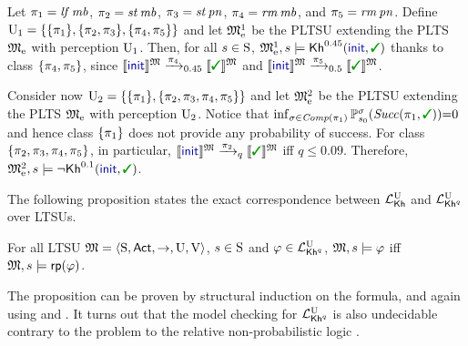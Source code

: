 \begin{example}\label{ex:running:pkhunc}
  Let
  $\plan_1 = \lift\,\mobile$, $\plan_2 = \stairs\,\mobile$,
  $\plan_3 = \stairs\,\panic$, $\plan_4 = \ramp\,\mobile$, and
  $\plan_5 = \ramp\,\panic$.
  Define
  $\Unc_1 = \{ \{\plan_1\}, \{\plan_2,\plan_3\}, \{\plan_4,\plan_5\}\}$
  and let $\modelex^1$ be the PLTSU extending the PLTS $\modelex$ with
  perception $\Unc_1$.
  Then, for all $s\in\S$,
  $\modelex^1,s \models \kh^{0.45}(\init,\goal)$ 
  thanks to class $\{\plan_4,\plan_5\}$, since
  $\truthset{\model}{\init}\reach{\plan_4}_{0.45}\truthset{\model}{\goal}$
  and
  $\truthset{\model}{\init}\reach{\plan_5}_{0.5}\truthset{\model}{\goal}$.

  Consider now
  $\Unc_2 = \{ \{\plan_1\}, \{\plan_2,\plan_3,\plan_4,\plan_5\}\}$
  and let $\modelex^2$ be the PLTSU extending the PLTS $\modelex$ with
  perception $\Unc_2$.
  Notice that
  $\inf_{\strat\in\Comp(\plan_1)}\Prob^\strat_{s_0}(\Succ(\plan_1,\goal)){=}0$
  and hence class $\{\plan_1\}$ does not provide any probability of
  success.
  For class $\{\plan_2,\plan_3,\plan_4,\plan_5\}$, in particular,
  $\truthset{\model}{\init}\reach{\plan_2}_q\truthset{\model}{\goal}$
  iff $q\leq 0.09$.
  Therefore, $\modelex^2, s \models \neg \kh^{0.1}(\init,\goal)$.
\end{example}


The following proposition states the exact correspondence between
$\Khunc$ and $\PKhunc$ over LTSUs.
%
%
\begin{proposition}\label{prop:Khunc:PKhunc}
    For all LTSU $\model = \tup{\S,\Act,\ra,\Unc,\V}$, $s\in\S$ and
    $\varphi\in\PKhunc$,
    $\model,s\models\varphi$ iff $\model,s\models\fgetprob(\varphi)$.
\end{proposition}

The proposition can be proven by structural induction on
the formula, and again using  and . 
It turns out that the model checking for $\PKhunc$ is also undecidable
contrary to the \PTIME problem to the relative non-probabilistic logic
\cite{DF23}.


